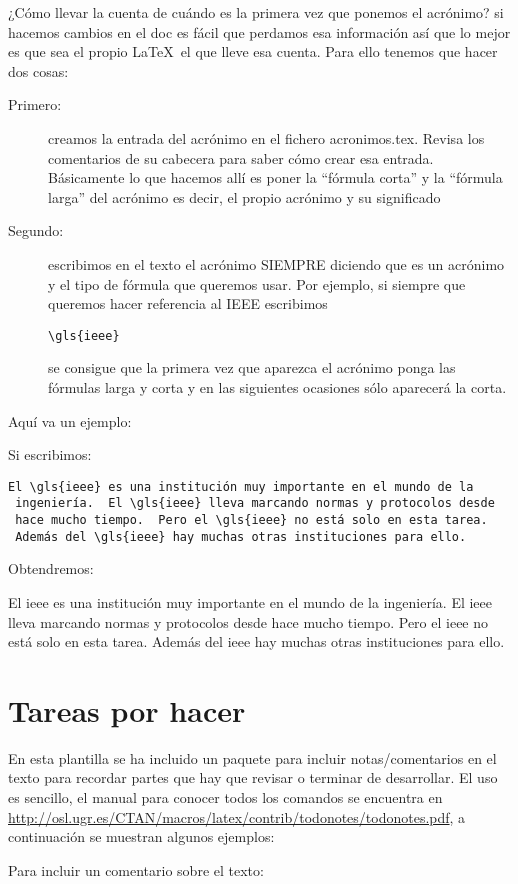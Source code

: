  ¿Cómo llevar la cuenta de cuándo es la primera vez que ponemos el acrónimo? si hacemos cambios en el doc es fácil que perdamos esa información así que lo mejor es que sea el propio \LaTeX~el que lleve esa cuenta. Para ello tenemos que hacer dos cosas:
 \begin{description}
 \item[Primero:] creamos la entrada del acrónimo en el fichero acronimos.tex. Revisa los comentarios de su cabecera para saber cómo crear esa entrada. Básicamente lo que hacemos allí es poner la ``fórmula corta'' y la ``fórmula larga'' del acrónimo es decir, el propio acrónimo y su significado
 \item[Segundo:] escribimos en el texto el acrónimo SIEMPRE diciendo que es un acrónimo y el tipo de fórmula que queremos usar. Por ejemplo, si siempre que queremos hacer referencia al IEEE escribimos \begin{lstlisting}[style=Latex-color]
 \gls{ieee}
 \end{lstlisting}  se consigue que la primera vez que aparezca el acrónimo ponga las fórmulas larga y corta y en las siguientes ocasiones sólo aparecerá la corta.
 \end{description}
 
 Aquí va un ejemplo:
 
 Si escribimos:
 
\begin{lstlisting}[style=Latex-color]
 El \gls{ieee} es una institución muy importante en el mundo de la
 ingeniería.  El \gls{ieee} lleva marcando normas y protocolos desde
 hace mucho tiempo.  Pero el \gls{ieee} no está solo en esta tarea. 
 Además del \gls{ieee} hay muchas otras instituciones para ello.  \end{lstlisting}
 
 Obtendremos: 
 
El \gls{ieee} es una institución muy importante en el mundo de la
 ingeniería.  El \gls{ieee} lleva marcando normas y protocolos desde
 hace mucho tiempo.  Pero el \gls{ieee} no está solo en esta tarea. 
 Además del \gls{ieee} hay muchas otras instituciones para ello.
 
 \section{Tareas por hacer}
 
 En esta plantilla se ha incluido un paquete para incluir notas/comentarios en el texto para recordar partes que hay que revisar o terminar de desarrollar. El uso es sencillo, el manual para conocer todos los comandos se encuentra en \url{http://osl.ugr.es/CTAN/macros/latex/contrib/todonotes/todonotes.pdf}, a continuación se muestran algunos ejemplos:
 \\
\par Para incluir un comentario sobre el texto:

